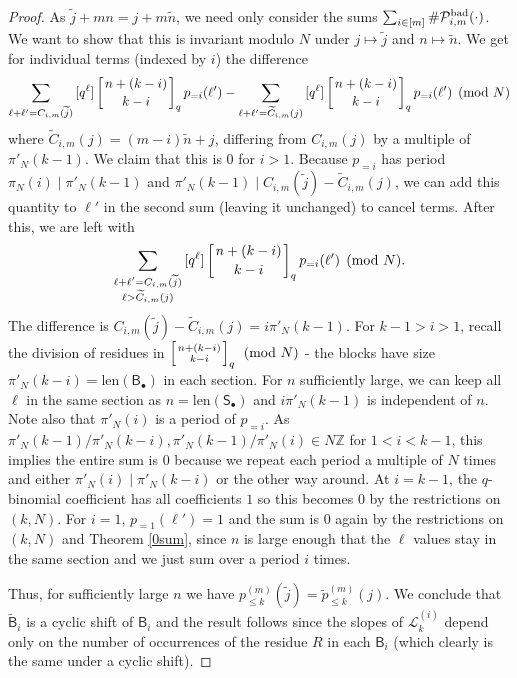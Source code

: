 \documentclass[12pt]{article}
\newcommand{\Z}{\mathbb{Z}}
\newcommand{\qbinom}[2]{\left[{#1 \atop #2}\right]_q}
\begin{document}
\begin{proof}
As $\widetilde{j}+mn=j+m\widetilde{n}$, we need only consider the sums $\sum_{i\in [m]}{\#\mathcal{P}^{\textup{bad}}_{i,m}(\cdot)}$. We want to show that this is invariant modulo $N$ under $j \mapsto \widetilde{j}$ and $n\mapsto \widetilde{n}$. We get for individual terms (indexed by $i$) the difference
\[ \sum_{\ell+\ell' = {C}_{i,m}(\widetilde{j})}{[q^\ell]\qbinom{n+(k-i)}{k-i}p_{=i}(\ell')} - \sum_{\ell+\ell' = \widetilde{C}_{i,m}(j)}{[q^\ell]\qbinom{n+(k-i)}{k-i}p_{=i}(\ell')} \pmod{N} \]
where $\widetilde{C}_{i,m}(j) = (m-i)\widetilde{n}+j$, differing from $C_{i,m}(j)$ by a multiple of $\pi'_N(k-1)$. We claim that this is $0$ for $i>1$. Because $p_{=i}$ has period $\pi_N(i) \mid \pi'_N(k-1)$ and $\pi'_N(k-1)\mid {C}_{i,m}(\widetilde{j})-\widetilde{C}_{i,m}(j)$, we can add this quantity to $\ell'$ in the second sum (leaving it unchanged) to cancel terms. After this, we are left with
\[\sum_{\substack{\ell + \ell' = {C}_{i,m}(\widetilde{j}) \\ \ell > \widetilde{C}_{i,m}(j)}}{[q^\ell]\qbinom{n+(k-i)}{k-i}p_{=i}(\ell')} \pmod{N}.\]
The difference is ${C}_{i,m}(\widetilde{j})-\widetilde{C}_{i,m}(j)=i\pi'_N(k-1)$. For $k-1>i>1$, recall the division of residues in $\qbinom{n+(k-i)}{k-i} \pmod{N}$ - the blocks have size $\pi'_N(k-i) = \text{len}(\mathsf{B_\bullet})$ in each section. For $n$ sufficiently large, we can keep all $\ell$ in the same section as $n=\text{len}(\mathsf{S}_\bullet)$ and $i\pi'_N(k-1)$ is independent of $n$. Note also that $\pi'_N(i)$ is a period of $p_{=i}$. As $\pi'_N(k-1)/\pi'_N(k-i), \pi'_N(k-1)/\pi'_N(i)\in N\Z$ for $1<i<k-1$, this implies the entire sum is $0$ because we repeat each period a multiple of $N$ times and either $\pi'_N(i) \mid \pi'_N(k-i)$ or the other way around. At $i=k-1$, the $q$-binomial coefficient has all coefficients $1$ so this becomes $0$ by the restrictions on $(k,N)$. For $i=1$, $p_{=1}(\ell')=1$ and the sum is $0$ again by the restrictions on $(k,N)$ and Theorem \ref{0sum}, since $n$ is large enough that the $\ell$ values stay in the same section and we just sum over a period $i$ times.

Thus, for sufficiently large $n$ we have $p_{\le k}^{(m)}(\widetilde{j}) = \widetilde{p}^{(m)}_{\le k}(j)$. We conclude that $\widetilde{\mathsf{B}}_i$ is a cyclic shift of $\mathsf{B}_i$ and the result follows since the slopes of $\mathcal{L}_{k}^{(i)}$ depend only on the number of occurrences of the residue $R$ in each $\mathsf{B}_i$ (which clearly is the same under a cyclic shift).
\end{proof}
\end{document}
